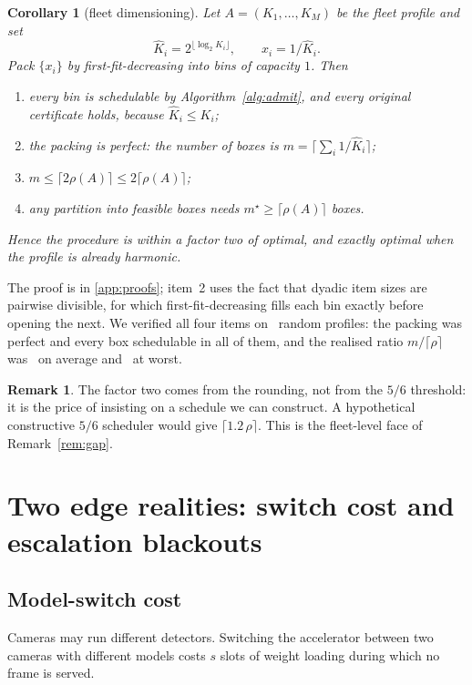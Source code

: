 \documentclass[preprint,review,12pt]{elsarticle}
\newtheorem{corollary}[theorem]{Corollary}
\theoremstyle{definition}
\newtheorem{remark}[theorem]{Remark}
\newcommand{\dens}{\rho}
\begin{document}
\begin{corollary}[fleet dimensioning]\label{cor:dimensioning}
Let $A=(K_1,\dots,K_M)$ be the fleet profile and set
\[
\hat K_i=2^{\lfloor\log_2 K_i\rfloor},\qquad x_i=1/\hat K_i .
\]
Pack $\{x_i\}$ by first-fit-decreasing into bins of capacity $1$. Then
\begin{enumerate}
\item every bin is schedulable by Algorithm~\ref{alg:admit}, and every original certificate holds,
      because $\hat K_i\le K_i$;
\item the packing is perfect: the number of boxes is $m=\big\lceil\sum_i 1/\hat K_i\big\rceil$;
\item $m\le\lceil 2\dens(A)\rceil\le 2\lceil\dens(A)\rceil$;
\item any partition into feasible boxes needs $m^\star\ge\lceil\dens(A)\rceil$ boxes.
\end{enumerate}
Hence the procedure is within a factor two of optimal, and exactly optimal when the profile is
already harmonic.
\end{corollary}

The proof is in \ref{app:proofs}; item~2 uses the fact that dyadic item sizes are pairwise
divisible, for which first-fit-decreasing fills each bin exactly before opening the next. We
verified all four items on \numCfourTrials\ random profiles: the packing was perfect and every box
schedulable in all of them, and the realised ratio $m/\lceil\dens\rceil$ was
\numCfourRatioMean\ on average and \numCfourRatioMax\ at worst.

\begin{remark}
The factor two comes from the rounding, not from the $5/6$ threshold: it is the price of insisting
on a schedule we can construct. A hypothetical constructive $5/6$ scheduler would give
$\lceil 1.2\,\dens\rceil$. This is the fleet-level face of Remark~\ref{rem:gap}.
\end{remark}

\section{Two edge realities: switch cost and escalation blackouts}\label{sec:extensions}

\subsection{Model-switch cost}\label{sec:switch}
Cameras may run different detectors. Switching the accelerator between two cameras with different
models costs $s$ slots of weight loading during which no frame is served.
\end{document}
